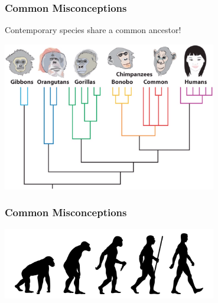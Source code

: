 \documentclass[10pt]{beamer}
\begin{document}
\begin{frame}[t]
\frametitle{Common Misconceptions}
\vspace{0.5cm}
	
	\begin{center}
		\textcolor{myblue}{Contemporary species share a common ancestor!}\\
		
		\vspace{0.75cm}
		
		\includegraphics[width=0.7\textwidth]{figures/ape.png}
	\end{center}
\end{frame}


\begin{frame}[t]
\frametitle{Common Misconceptions}
\vspace{0.5cm}
	
	\begin{center}
		\includegraphics[width=0.7\textwidth]{figures/ape2.jpg}
	\end{center}
\end{frame}
\end{document}
